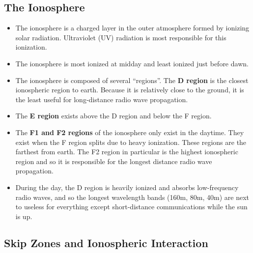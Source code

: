 \documentclass[letterpaper,12pt]{scrartcl}
\begin{document}
\subsection{The Ionosphere}

\begin{itemize}
\item The ionosphere is a charged layer in the outer atmosphere formed by ionizing solar radiation. Ultraviolet (UV) radiation is most responsible for this ionization.
\item The ionosphere is most ionized at midday and least ionized just before dawn.
\item The ionosphere is composed of several ``regions''. The \textbf{D region} is the closest ionospheric region to earth. Because it is relatively close to the ground,
  it is the least useful for long-distance radio wave propagation.
\item The \textbf{E region} exists above the D region and below the F region.
\item The \textbf{F1 and F2 regions} of the ionosphere only exist in the daytime. They exist when the F region splits due to heavy ionization.
  These regions are the farthest from earth. The F2 region in particular is the highest ionospheric region
  and so it is responsible for the longest distance radio wave propagation.
\item During the day, the D region is heavily ionized and
  absorbs low-frequency radio waves, and so the longest wavelength bands (160m, 80m, 40m) are next to useless for everything except short-distance communications while the sun is up.
\end{itemize}

\subsection{Skip Zones and Ionospheric Interaction}
\end{document}

